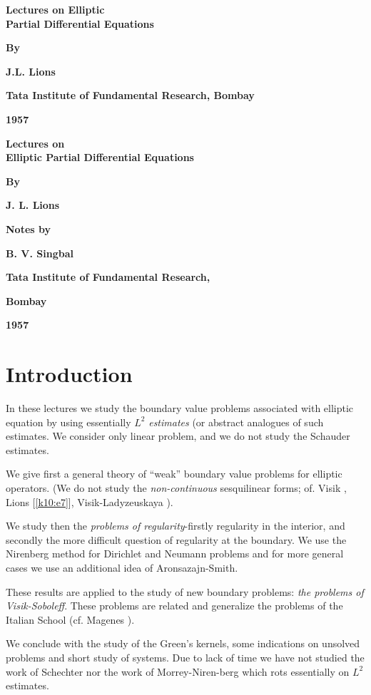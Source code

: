 \thispagestyle{empty}

\begin{center}
{\Large\bf Lectures on Elliptic}\\[5pt]
{\Large\bf Partial Differential Equations}
\vskip 1cm

{\bf  By}
\medskip

{\large\bf  J.L. Lions}
\vfill

{\bf  Tata Institute of Fundamental Research, Bombay}

{\bf  1957}
\end{center}

\eject

\thispagestyle{empty}
\begin{center}
{\Large\bf Lectures on} \\[5pt]
{\Large\bf Elliptic Partial Differential Equations}
\vskip 1cm

{\bf  By}
\medskip

{\large\bf  J. L. Lions}
\vfill

{\bf  Notes by}
\medskip

{\large\bf  B. V. Singbal}
\vfill

{\bf  Tata Institute of Fundamental Research,}

{\bf  Bombay}

{\bf  1957}
\end{center}

\chapter*{Introduction}


In these lectures we study the boundary value problems associated with
elliptic equation by using essentially $L^2$ \textit{estimates} (or
abstract analogues of such estimates. We consider only linear problem,
and we do not study the Schauder estimates. 

We give first a general theory of ``weak'' boundary value problems for
elliptic operators. (We do not study the \textit{non-continuous}
sesquilinear forms; of. Visik \cite{k17}, Lions [\ref{k10:e7}], Visik-Ladyzeuskaya
\cite{k19}). 

We study then the \textit{problems of regularity}-firstly regularity
in the interior, and secondly the more difficult question of
regularity at the boundary. We use the Nirenberg method for Dirichlet
and Neumann problems and for more general cases we use an additional
idea of Aronsazajn-Smith. 

These results are applied to the study of new boundary problems:
\textit{the problems of Visik-Soboleff}. These problems are related
and generalize the problems of the Italian School (cf. Magenes
\cite{k11}). 
 
We conclude with the study of the Green's kernels, some indications on
unsolved problems and short study of systems. Due to lack of time we
have not studied the work of Schechter \cite{k15} nor the work of
Morrey-Niren-berg \cite{k13} which rots essentially on $L^2$ estimates. 
